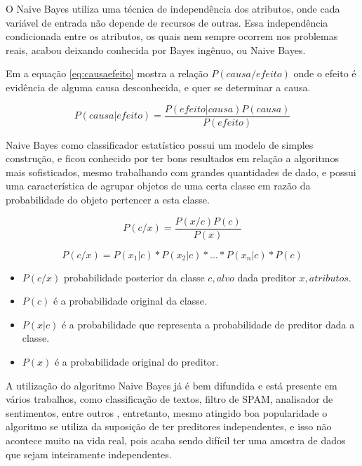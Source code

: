 O Naive Bayes utiliza uma técnica de independência dos atributos, onde cada variável de entrada não depende de recursos de outras. Essa independência condicionada  entre os atributos, os quais nem sempre ocorrem nos problemas reais, acabou deixando conhecida por Bayes ingênuo, ou Naive Bayes.

Em \cite{RusselStuart.Norvig2013} a equação \ref{eq:causaefeito} mostra a relação ${P(causa/efeito)}$ onde o efeito é evidência de alguma causa desconhecida, e quer se determinar a causa.

\begin{equation} \label{eq:causaefeito}
 P(causa|efeito)= \frac{P(efeito|causa)P(causa)}{P(efeito)}
\end{equation}

Naive Bayes como classificador estatístico possui um modelo de simples construção, e ficou conhecido por ter bons resultados em relação a algoritmos mais sofisticados, mesmo trabalhando com grandes quantidades de dado, e possui uma característica de agrupar objetos de uma certa classe em razão da probabilidade do objeto pertencer a esta classe. 

\begin{equation}
 P(c/x)= \frac{P(x/c)P(c)}{P(x)}
\end{equation}

\begin{equation}
 P(c/x)=P(x_1|c)*P(x_2|c)*...*P(x_n|c)*P(c)
 \label{eq:bayes}
\end{equation}


\begin{itemize}
 \item ${P(c/x)}$ probabilidade posterior da classe ${c,alvo}$ dada preditor ${x,atributos}$.
 \item ${P(c)}$  é a probabilidade original da classe.
 \item ${P(x|c)}$  é a probabilidade que representa a probabilidade de preditor dada a classe.
 \item ${P(x)}$  é a probabilidade original do preditor.
\end{itemize}

A utilização do algoritmo Naive Bayes já é bem difundida e está presente em vários trabalhos, como classificação de textos, filtro de SPAM, analisador de sentimentos, entre outros \cite{Madureira2017, Lucca2013, Wu2008, Mccallum1997}, entretanto, mesmo atingido boa popularidade o algoritmo se utiliza da suposição de ter preditores independentes, e isso não acontece muito na vida real, pois acaba sendo difícil ter uma amostra de dados que sejam inteiramente independentes. 

